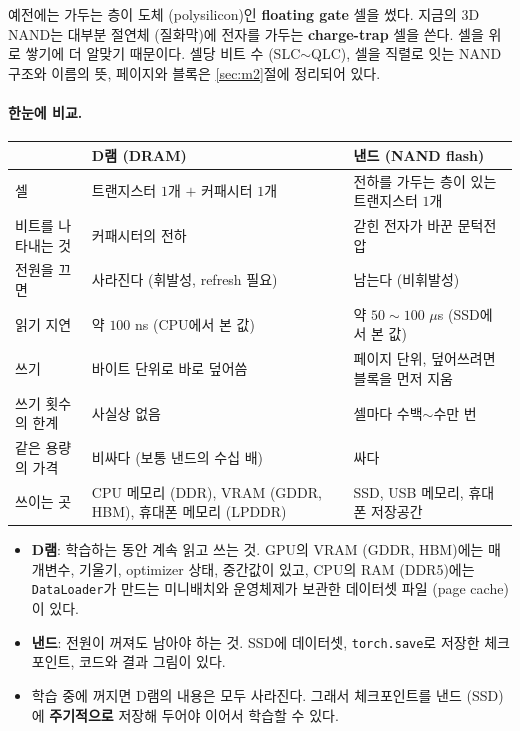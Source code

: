 \documentclass[11pt,a4paper]{article}
\begin{document}
예전에는 가두는 층이 도체 (polysilicon)인 \textbf{floating gate} 셀을 썼다.
지금의 3D NAND는 대부분 절연체 (질화막)에 전자를 가두는 \textbf{charge-trap} 셀을 쓴다. 셀을 위로 쌓기에 더 알맞기 때문이다.
셀당 비트 수 (SLC$\sim$QLC), 셀을 직렬로 잇는 NAND 구조와 이름의 뜻, 페이지와 블록은 \ref{sec:m2}절에 정리되어 있다.

\paragraph{한눈에 비교.}
\begin{center}
{\small
\begin{tabular}{@{}l>{\raggedright\arraybackslash}p{58mm}>{\raggedright\arraybackslash}p{58mm}@{}}
\toprule
& D램 (DRAM) & 낸드 (NAND flash) \\
\midrule
셀 & 트랜지스터 $1$개 $+$ 커패시터 $1$개 & 전하를 가두는 층이 있는 트랜지스터 $1$개 \\
비트를 나타내는 것 & 커패시터의 전하 & 갇힌 전자가 바꾼 문턱전압 \\
전원을 끄면 & 사라진다 (휘발성, refresh 필요) & 남는다 (비휘발성) \\
읽기 지연 & 약 $100$ ns (CPU에서 본 값) & 약 $50\sim100$ $\mu$s (SSD에서 본 값) \\
쓰기 & 바이트 단위로 바로 덮어씀 & 페이지 단위, 덮어쓰려면 블록을 먼저 지움 \\
쓰기 횟수의 한계 & 사실상 없음 & 셀마다 수백$\sim$수만 번 \\
같은 용량의 가격 & 비싸다 (보통 낸드의 수십 배) & 싸다 \\
쓰이는 곳 & CPU 메모리 (DDR), VRAM (GDDR, HBM), 휴대폰 메모리 (LPDDR) & SSD, USB 메모리, 휴대폰 저장공간 \\
\bottomrule
\end{tabular}}
\end{center}

\begin{mlbox}
\begin{itemize}[leftmargin=1.5em]
\item \textbf{D램}: 학습하는 동안 계속 읽고 쓰는 것. GPU의 VRAM (GDDR, HBM)에는 매개변수, 기울기, optimizer 상태, 중간값이 있고,
CPU의 RAM (DDR5)에는 \texttt{DataLoader}가 만드는 미니배치와 운영체제가 보관한 데이터셋 파일 (page cache)이 있다.
\item \textbf{낸드}: 전원이 꺼져도 남아야 하는 것. SSD에 데이터셋, \texttt{torch.save}로 저장한 체크포인트, 코드와 결과 그림이 있다.
\item 학습 중에 꺼지면 D램의 내용은 모두 사라진다. 그래서 체크포인트를 낸드 (SSD)에 \textbf{주기적으로} 저장해 두어야 이어서 학습할 수 있다.
\end{itemize}
\end{mlbox}
\end{document}
